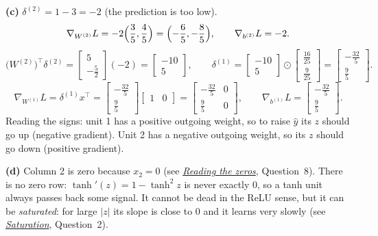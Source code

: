 \documentclass[12pt,a4paper]{article}
\newcommand{\seeconcept}[3]{(see \hyperref[#1]{\textit{#2}}, Question~#3)}
\begin{document}
\textbf{(c)} $\delta^{(2)}=1-3=-2$ (the prediction is too low).
\[
\nabla_{W^{(2)}}L=-2\Bigl(\frac35,\frac45\Bigr)=\Bigl(-\frac65,-\frac85\Bigr),\qquad \nabla_{b^{(2)}}L=-2 .
\]
\[
\bigl(W^{(2)}\bigr)^\top\delta^{(2)}=\begin{bmatrix}5\\-\tfrac52\end{bmatrix}(-2)=\begin{bmatrix}-10\\5\end{bmatrix},\qquad
\delta^{(1)}=\begin{bmatrix}-10\\5\end{bmatrix}\odot\begin{bmatrix}\tfrac{16}{25}\\ \tfrac9{25}\end{bmatrix}=\begin{bmatrix}-\tfrac{32}{5}\\ \tfrac95\end{bmatrix}.
\]
\[
\nabla_{W^{(1)}}L=\delta^{(1)}x^\top=\begin{bmatrix}-\tfrac{32}5\\ \tfrac95\end{bmatrix}\begin{bmatrix}1&0\end{bmatrix}=\begin{bmatrix}-\tfrac{32}{5}&0\\ \tfrac95&0\end{bmatrix},\qquad \nabla_{b^{(1)}}L=\begin{bmatrix}-\tfrac{32}5\\ \tfrac95\end{bmatrix}.
\]
Reading the signs: unit 1 has a positive outgoing weight, so to raise $\hat y$ its $z$ should go up (negative gradient). Unit 2 has a negative outgoing weight, so its $z$ should go down (positive gradient).

\textbf{(d)} Column 2 is zero because $x_2=0$ \seeconcept{c:readzeros}{Reading the zeros}{8}. There is no zero row: $\tanh'(z)=1-\tanh^2z$ is never exactly 0, so a tanh unit always passes back some signal. It cannot be dead in the ReLU sense, but it can be \emph{saturated}: for large $|z|$ its slope is close to 0 and it learns very slowly \seeconcept{c:saturation}{Saturation}{2}.
\end{document}

